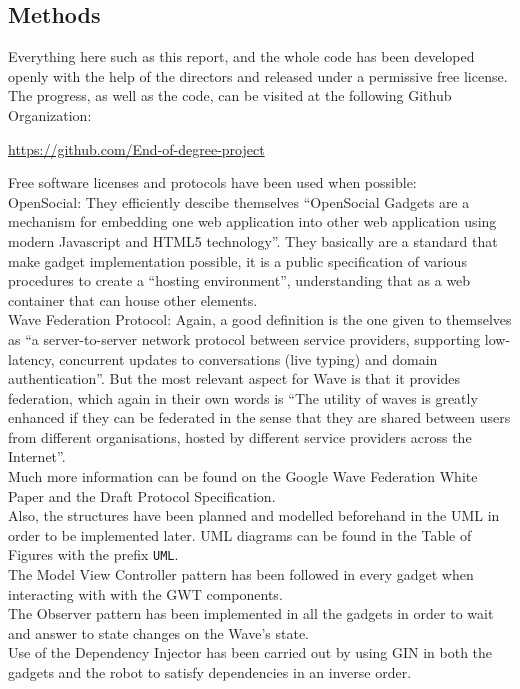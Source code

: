 \subsection{Methods}
Everything here such as this report, and the whole code has been developed openly with the help of the directors and released under a permissive free license. The progress, as well as the code, can be visited at the following Github Organization:
\begin{center}\url{https://github.com/End-of-degree-project}\end{center}
Free software licenses and protocols have been used when possible:\\[.2cm]
OpenSocial\cite{ref:opensocial}: They efficiently descibe themselves ``OpenSocial Gadgets are a mechanism for embedding one web application into other web application using modern Javascript and HTML5 technology''. They basically are a standard that make gadget implementation possible, it is a public specification of various procedures to create a ``hosting environment'', understanding that as a web container that can house other elements.\\[.2cm]
Wave Federation Protocol\cite{ref:wave_federation_protocol}: Again, a good definition is the one given to themselves as ``a server-to-server network protocol between service providers, supporting low-latency, concurrent updates to conversations (live typing) and domain authentication''. But the most relevant aspect for Wave is that it provides federation, which again in their own words is ``The utility of waves is greatly enhanced if they can be federated in the sense that they are shared between users from different organisations, hosted by different service providers across the Internet''.\\[.2cm]
Much more information can be found on the Google Wave Federation White Paper\cite{ref:wave_white_paper} and the Draft Protocol Specification\cite{ref:wave_over_xmpp}.\\[.2cm]
Also, the structures have been planned and modelled beforehand in the UML\cite{ref:uml} in order to be implemented later. UML diagrams can be found in the Table of Figures with the prefix \verb|UML|.\\[.2cm]
The Model View Controller pattern has been followed in every gadget when interacting with with the GWT components.\\[.2cm]
The Observer pattern has been implemented in all the gadgets in order to wait and answer to state changes on the Wave's state.\\[.2cm]
Use of the Dependency Injector has been carried out by using GIN in both the gadgets and the robot to satisfy dependencies in an inverse order\cite{ref:dependency_injection}.

